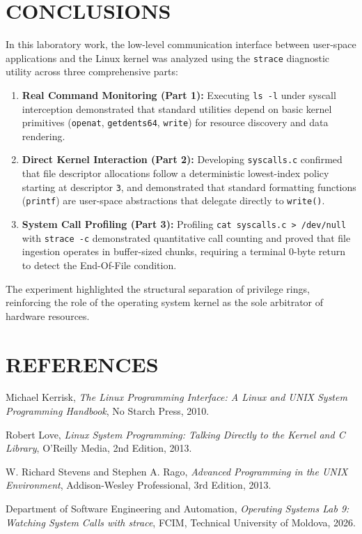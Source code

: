 \documentclass[12pt,a4paper]{report}
\numberwithin{equation}{chapter}
\numberwithin{figure}{chapter}
\numberwithin{table}{chapter}
\begin{document}
\chapter{CONCLUSIONS}
In this laboratory work, the low-level communication interface between user-space applications and the Linux kernel was analyzed using the \texttt{strace} diagnostic utility across three comprehensive parts:
\begin{enumerate}
    \item \textbf{Real Command Monitoring (Part 1):} Executing \texttt{ls -l} under syscall interception demonstrated that standard utilities depend on basic kernel primitives (\texttt{openat}, \texttt{getdents64}, \texttt{write}) for resource discovery and data rendering.
    \item \textbf{Direct Kernel Interaction (Part 2):} Developing \texttt{syscalls.c} confirmed that file descriptor allocations follow a deterministic lowest-index policy starting at descriptor \texttt{3}, and demonstrated that standard formatting functions (\texttt{printf}) are user-space abstractions that delegate directly to \texttt{write()}.
    \item \textbf{System Call Profiling (Part 3):} Profiling \texttt{cat syscalls.c > /dev/null} with \texttt{strace -c} demonstrated quantitative call counting and proved that file ingestion operates in buffer-sized chunks, requiring a terminal 0-byte return to detect the End-Of-File condition.
\end{enumerate}

The experiment highlighted the structural separation of privilege rings, reinforcing the role of the operating system kernel as the sole arbitrator of hardware resources.

\chapter*{REFERENCES}

\noindent [1] Michael Kerrisk, \textit{The Linux Programming Interface: A Linux and UNIX System Programming Handbook}, No Starch Press, 2010.

\noindent [2] Robert Love, \textit{Linux System Programming: Talking Directly to the Kernel and C Library}, O'Reilly Media, 2nd Edition, 2013.

\noindent [3] W. Richard Stevens and Stephen A. Rago, \textit{Advanced Programming in the UNIX Environment}, Addison-Wesley Professional, 3rd Edition, 2013.

\noindent [4] Department of Software Engineering and Automation, \textit{Operating Systems Lab 9: Watching System Calls with strace}, FCIM, Technical University of Moldova, 2026.
\end{document}
